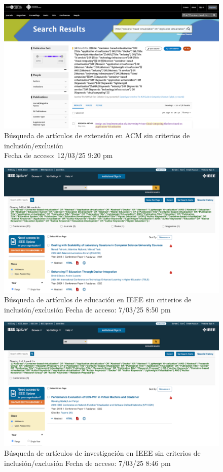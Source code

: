 \FloatBarrier\begin{figure}[H]
    \centering
    \includegraphics[width=\textwidth,keepaspectratio]{apendices/BD/sin-criterios/ACM-ind.png}
    \caption{Búsqueda de artículos de extensión en ACM sin criterios de inclusión/exclusión \\
    Fecha de acceso: 12/03/25 9:20 pm
    }
\end{figure}
\FloatBarrier\begin{figure}[H]
    \centering
    \includegraphics[width=\textwidth,keepaspectratio]{apendices/BD/sin-criterios/IEEE-ed.png}
    \caption{Búsqueda de artículos de educación en IEEE sin criterios de inclusión/exclusión
    Fecha de acceso: 7/03/25 8:50 pm
    }
\end{figure}
\FloatBarrier\begin{figure}[H]
    \centering
    \includegraphics[width=\textwidth,keepaspectratio]{apendices/BD/sin-criterios/IEEE-inv.png}
    \caption{Búsqueda de artículos de investigación en IEEE sin criterios de inclusión/exclusión
    Fecha de acceso: 7/03/25 8:46 pm
    }
\end{figure}
